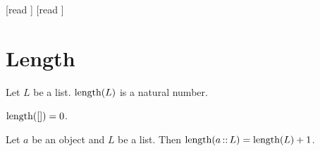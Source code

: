 \documentclass[10pt]{article}
\begin{document}
  \begin{imports}
    \begin{forthel}
      [read ]
      [read ]
    \end{forthel}
  \end{imports}


  \section*{Length}

  \begin{forthel}
    \begin{signature}[id=LISTS_LENGTH_4578620297183232,printid]
      Let $L$ be a list.
      $\textrm{length}(L)$ is a natural number.
    \end{signature}
  \end{forthel}

  \begin{forthel}
    \begin{axiom}[id=LISTS_LENGTH_3703161885818880,printid]
      $\textrm{length}([]) = 0$.
    \end{axiom}
  \end{forthel}

  \begin{forthel}
    \begin{axiom}[id=LISTS_LENGTH_8050301789536256,printid]
      Let $a$ be an object and $L$ be a list.
      Then $\textrm{length}(a \mathop{::} L) = \textrm{length}(L) + 1$.
    \end{axiom}
  \end{forthel}
\end{document}
